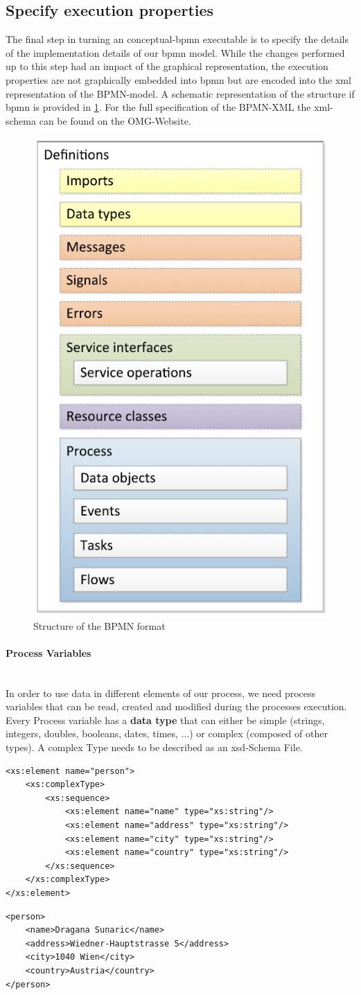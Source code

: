 \subsection{Specify execution properties}
The final step in turning an \gls{conceptual-bpmn} executable is to specify the details of the implementation details of our \gls{bpmn} model. While the changes performed up to this step had an impact of the graphical representation, the execution properties are not graphically embedded into \gls{bpmn} but are encoded into the \gls{xml} representation of the BPMN-model. \cite{fundamentals} A schematic representation of the structure if \gls{bpmn} is provided in \ref{fig:bpmn-schema}. For the full specification of the BPMN-XML the \gls{xml}-schema can be found on the OMG-Website\cite{BPMN-xml-spec}. 
\begin{figure}[H]
		\centering
		\includegraphics[width=0.3\columnwidth]{graphics/bpmn-schema}
		\caption{Structure of the BPMN format \cite{fundamentals}} 
		\label{fig:bpmn-schema} 
\end{figure}


\paragraph{Process Variables}~\\
In order to use data in different elements of our process, we need process variables that can be read, created and modified during the processes execution. Every Process variable has a \textbf{data type} that can either be simple (strings, integers, doubles, booleans, dates, times, ...) or complex (composed of other types). A complex Type needs to be described as an \gls{xsd}-Schema File.\\
\lstset{language=XML}
	\begin{lstlisting}[caption={The \gls{xml}-Schema Definiton for a complex type 'person'},captionpos=b]
<xs:element name="person">
	<xs:complexType>
		<xs:sequence>
			<xs:element name="name" type="xs:string"/>
			<xs:element name="address" type="xs:string"/>
			<xs:element name="city" type="xs:string"/>
			<xs:element name="country" type="xs:string"/>
		</xs:sequence>
	</xs:complexType>
</xs:element>
	\end{lstlisting}
\begin{lstlisting}[caption={An instance of the complex type 'person'},captionpos=b]
<person>
	<name>Dragana Sunaric</name>
	<address>Wiedner-Hauptstrasse 5</address>
	<city>1040 Wien</city>
	<country>Austria</country>
</person>
\end{lstlisting}


